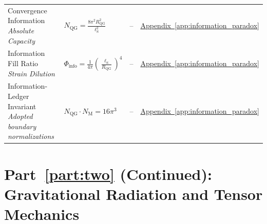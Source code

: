 \begin{longtable}{@{} p{4.5cm} p{6cm} c p{4cm} @{}}
{\raggedright Convergence Information \newline \textit{Absolute Capacity}\par} & {\raggedright $N_{\mathrm{QG}} = \frac{8\pi^2 R_{\mathrm{QG}}^2}{\ell_{\mathrm{S}}^2}$\par} & -- & {\raggedright \hyperref[app:information_paradox]{Appendix~\ref*{app:information_paradox}}\par} \\

{\raggedright Information Fill Ratio \newline \textit{Strain Dilution}\par} & {\raggedright $\Phi_{\mathrm{info}} = \frac{1}{4\pi} \left( \frac{\ell_{\mathrm{S}}}{R_{\mathrm{QG}}} \right)^4$\par} & -- & {\raggedright \hyperref[app:information_paradox]{Appendix~\ref*{app:information_paradox}}\par} \\

{\raggedright Information-Ledger Invariant \newline \textit{Adopted boundary normalizations}\par} & {\raggedright $N_{\mathrm{QG}} \cdot N_{\mathrm{M}} = 16\pi^3$\par} & -- & {\raggedright \hyperref[app:information_paradox]{Appendix~\ref*{app:information_paradox}}\par} \\

\bottomrule
\end{longtable}

\par\ifdim\dimexpr\pagegoal-\pagetotal\relax<12\baselineskip\newpage\fi
\section*{Part~\ref{part:two} (Continued): Gravitational Radiation and Tensor Mechanics}

